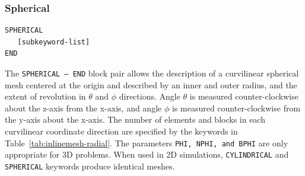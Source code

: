 \clearpage
\subsubsection{Spherical}
{\ttfamily \begin{verbatim}
SPHERICAL
   [subkeyword-list]
END
\end{verbatim}
}

The \texttt{SPHERICAL -- END} block pair allows the description of a
curvilinear spherical mesh centered at the origin and described by an
inner and outer radius, and the extent of revolution in $\theta$ and $\phi$
directions.  Angle $\theta$ is measured counter-clockwise about the z-axis from
the x-axis, and angle $\phi$ is measured counter-clockwise from the y-axis
about the x-axis.  The number of elements and blocks in each
curvilinear coordinate direction are specified by the keywords in
Table~\ref{tab:inlinemesh-radial}.  The parameters \texttt{PHI, NPHI,
and BPHI} are only appropriate for 3D problems. When used in 2D
simulations, \texttt{CYLINDRICAL} and \texttt{SPHERICAL} keywords
produce identical meshes.


